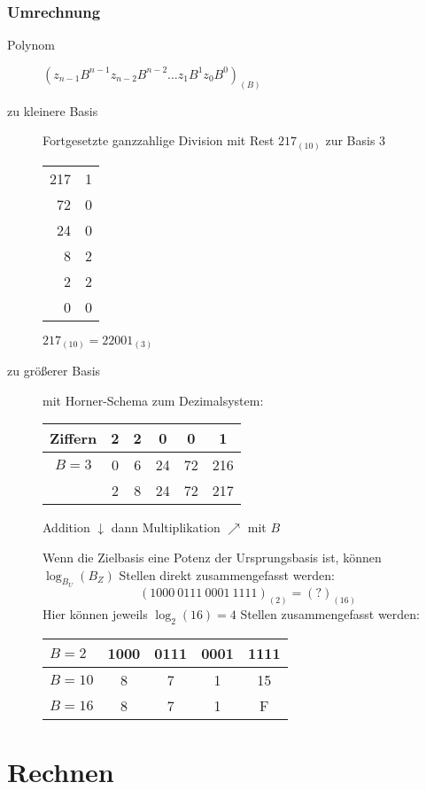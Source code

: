 \documentclass[12pt,a4paper]{article}
\begin{document}
\subsubsection{Umrechnung}
\begin{description}
	\item[Polynom] $(z_{n-1}B^{n-1}z_{n-2}B^{n-2} \dots z_1B^{1}z_0B^{0})_{(B)}$
	\item[zu kleinere Basis] Fortgesetzte ganzzahlige Division mit Rest
		$217_{(10)}$ zur Basis 3 \\
		\begin{tabular}{r c}
			217 & 1 \\
			72  & 0 \\
			24  & 0 \\
			8   & 2 \\
			2   & 2 \\
			0   & 0
		\end{tabular} $217_{(10)} = 22001_{(3)}$
	\item[zu größerer Basis] mit Horner-Schema zum Dezimalsystem:

		\begin{tabular}{|c||c|c|c|c|c|} \hline
			Ziffern & 2 & 2 & 0  & 0  & 1   \\ \hline \hline
			$B=3$   & 0 & 6 & 24 & 72 & 216 \\ \hline
			        & 2 & 8 & 24 & 72 & 217 \\ \hline
		\end{tabular} Addition $\downarrow$ dann Multiplikation $\nearrow$ mit $B$

		Wenn die Zielbasis eine Potenz der Ursprungsbasis ist, können $\log_{B_U}(B_Z)$ Stellen direkt zusammengefasst werden:
		$$(1000\ 0111\ 0001\ 1111)_{(2)}=(?)_{(16)}$$
		Hier können jeweils $\log_2(16)=4$ Stellen zusammengefasst werden:

		\begin{tabular}[t]{|l||c|c|c|c|} \hline
			$B = 2$  & 1000 & 0111 & 0001 & 1111 \\ \hline
			$B = 10$ & 8    & 7    & 1    & 15   \\ \hline
			$B = 16$ & 8    & 7    & 1    & F    \\ \hline
		\end{tabular}
\end{description}

\section{Rechnen}
\end{document}

